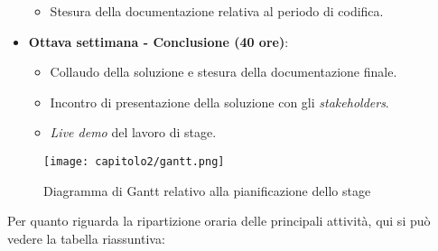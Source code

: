 \begin{itemize}
\begin{itemize}
      \item Stesura della documentazione relativa al periodo di codifica.
  \end{itemize}
  \item \textbf{Ottava settimana - Conclusione (40 ore)}:
  \begin{itemize}
      \item Collaudo della soluzione e stesura della documentazione finale.
      \item Incontro di presentazione della soluzione con gli \emph{stakeholders}.
      \item \emph{Live demo} del lavoro di stage.
  \end{itemize}
\end{itemize}

\begin{figure}[!h]
  \centering
  \texttt{[image: capitolo2/gantt.png]}
  \caption{Diagramma di Gantt relativo alla pianificazione dello stage}
\end{figure}

Per quanto riguarda la ripartizione oraria delle principali attività, qui si può vedere la tabella riassuntiva: \\

